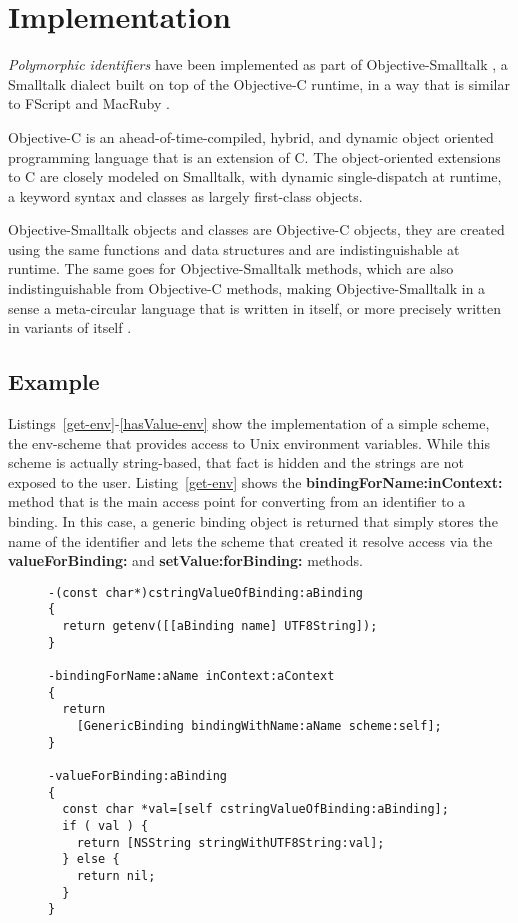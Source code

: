 \documentclass[preprint,authoryear]{acm_proc_article-sp}
\begin{document}
\section{Implementation}
\label{implementation}

\emph{Polymorphic identifiers} have been implemented as part of Objective-Smalltalk \cite{objst},
a Smalltalk dialect built on top of the Objective-C\cite{objc-evol}\cite{objc-apple} runtime, 
in a way that is similar to FScript\cite{fscript} and MacRuby \cite{macruby}.

Objective-C is an ahead-of-time-compiled, hybrid, and dynamic object oriented programming language
that is an extension of C.  The object-oriented extensions to C are closely modeled on
Smalltalk, with dynamic single-dispatch at runtime, a keyword syntax and classes as
largely first-class objects.

Objective-Smalltalk objects and classes are Objective-C objects, they are created using
the same functions and data structures and are indistinguishable at runtime.
The same goes for Objective-Smalltalk methods, which are also indistinguishable from
Objective-C methods, making Objective-Smalltalk in a sense a meta-circular language
that is written in itself, or more precisely written in variants of itself \cite{kleinvm}\cite{squeak}.



\subsection{Example}

Listings~\ref{get-env}-\ref{hasValue-env} show the implementation of a simple scheme,
the env-scheme that provides access to Unix environment variables.  While this scheme
is actually string-based, that fact is hidden and the strings are not exposed to the user.
Listing~\ref{get-env}
shows the {\bf bindingForName:inContext:} method that is the main access point for
converting from an identifier to a binding.  In this case, a generic binding object is returned
that simply stores the name of the identifier and lets the scheme that created it resolve
access via the {\bf valueForBinding:} and {\bf setValue:forBinding:} methods.


\begin{figure}[htbp]
\begin{lstlisting}[style=L,label=get-env,caption=Basic lookup in env: scheme.]
-(const char*)cstringValueOfBinding:aBinding
{
  return getenv([[aBinding name] UTF8String]);
}

-bindingForName:aName inContext:aContext
{
  return
    [GenericBinding bindingWithName:aName scheme:self];
}

-valueForBinding:aBinding
{
  const char *val=[self cstringValueOfBinding:aBinding];
  if ( val ) {
    return [NSString stringWithUTF8String:val];
  } else {
    return nil;
  }
}
\end{lstlisting}
\end{figure}
\end{document}
